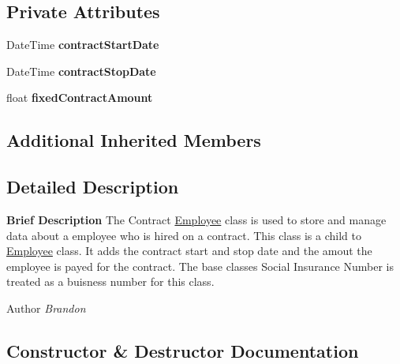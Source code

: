 \subsection*{Private Attributes}
\begin{DoxyCompactItemize}
\item 
\hypertarget{class_all_employees_1_1_contract_employee_aeef462cc8bd0639b674bba0632b6586b}{}Date\+Time {\bfseries contract\+Start\+Date}\label{class_all_employees_1_1_contract_employee_aeef462cc8bd0639b674bba0632b6586b}

\item 
\hypertarget{class_all_employees_1_1_contract_employee_ab549d2c8addad182fd66246c41ca73b7}{}Date\+Time {\bfseries contract\+Stop\+Date}\label{class_all_employees_1_1_contract_employee_ab549d2c8addad182fd66246c41ca73b7}

\item 
\hypertarget{class_all_employees_1_1_contract_employee_a81526f8517894ce466b70e3ffa61a8a8}{}float {\bfseries fixed\+Contract\+Amount}\label{class_all_employees_1_1_contract_employee_a81526f8517894ce466b70e3ffa61a8a8}

\end{DoxyCompactItemize}
\subsection*{Additional Inherited Members}


\subsection{Detailed Description}
{\bfseries Brief Description} The Contract \hyperlink{class_all_employees_1_1_employee}{Employee} class is used to store and manage data about a employee who is hired on a contract. This class is a child to \hyperlink{class_all_employees_1_1_employee}{Employee} class. It adds the contract start and stop date and the amout the employee is payed for the contract. The base classes Social Insurance Number is treated as a buisness number for this class. 

\begin{DoxyAuthor}{Author}
{\itshape Brandon} 
\end{DoxyAuthor}


\subsection{Constructor \& Destructor Documentation}
\hypertarget{class_all_employees_1_1_contract_employee_afb78892e913ff2a34aed4d7b78d6c9f7}{}
